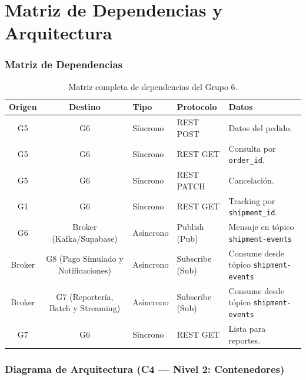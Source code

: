 \documentclass[11pt, a4paper]{article}
\begin{document}
\newpage
\part{Matriz de Dependencias y Arquitectura}

\section{Matriz de Dependencias}

\begin{table}[h!]
\centering
\renewcommand{\arraystretch}{1.5}
\begin{tabularx}{\textwidth}{c c l l X}
  \toprule
  \textbf{Origen} & \textbf{Destino} & \textbf{Tipo} & \textbf{Protocolo} & \textbf{Datos} \\
  \midrule
  G5  & G6  & Síncrono  & REST POST    & Datos del pedido. \\
  G5  & G6  & Síncrono  & REST GET     & Consulta por \texttt{order\_id}. \\
  G5  & G6  & Síncrono  & REST PATCH   & Cancelación. \\
  G1  & G6  & Síncrono  & REST GET     & Tracking por \texttt{shipment\_id}. \\
  G6     & Broker (Kafka/Supabase) & Asíncrono & Publish (Pub)   & Mensaje en tópico \texttt{shipment-events} \\
  Broker & G8 (Pago Simulado y Notificaciones)     & Asíncrono & Subscribe (Sub) & Consume desde tópico \texttt{shipment-events} \\
  Broker & G7 (Reportería, Batch y Streaming)        & Asíncrono & Subscribe (Sub) & Consume desde tópico \texttt{shipment-events} \\
  G7 & G6  & Síncrono  & REST GET     & Lista para reportes. \\
  \bottomrule
\end{tabularx}
\caption{Matriz completa de dependencias del Grupo 6.}
\end{table}


\section{Diagrama de Arquitectura (C4 --- Nivel 2: Contenedores)}
\end{document}
